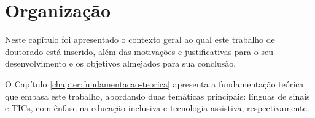 



\section{Organização}

Neste capítulo foi apresentado o contexto geral ao qual este trabalho de doutorado está inserido, além das motivações e justificativas para o seu desenvolvimento e os objetivos almejados para sua conclusão. 

O Capítulo \ref{chapter:fundamentacao-teorica} apresenta a fundamentação teórica que embasa este trabalho, abordando duas temáticas principais: línguas de sinais e TICs, com ênfase na educação inclusiva e tecnologia assistiva, respectivamente.

